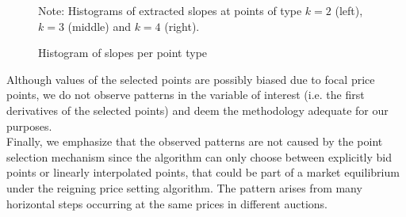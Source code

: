 \begin{figure}[!ht]
\begin{center}
\caption{Histogram of slopes per point type}
\label{histpattern1}
\end{center}
{ \small Note: Histograms of extracted slopes at points of type $k=2$ (left), $k=3$ (middle) and $k=4$ (right).} 
\end{figure}

Although values of the selected points are possibly biased due to focal price points, we do not observe patterns in the variable of interest (i.e. the first derivatives of the selected points) and deem the methodology adequate for our purposes. \\

Finally, we emphasize that the observed patterns are not caused by the point selection mechanism since the algorithm can only choose between explicitly bid points or linearly interpolated points, that could be part of a market equilibrium under the reigning price setting algorithm. The pattern arises from many horizontal steps occurring at the same prices in different auctions. 


